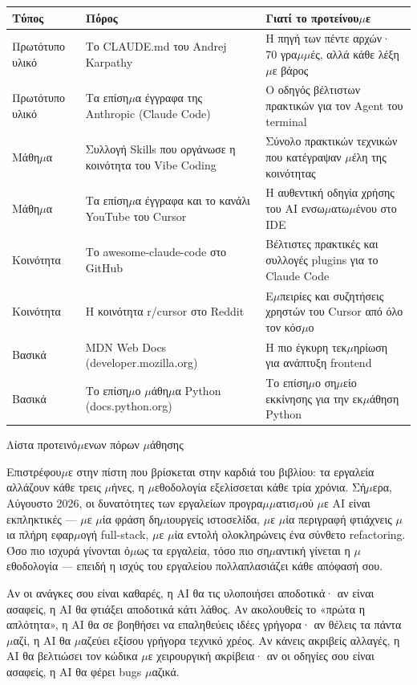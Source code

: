 \begin{center}
\begin{tabularx}{\linewidth}{|X|X|X|}
\hline
\textbf{Τύπος} & \textbf{Πόρος} & \textbf{Γιατί το προτείνου$\mu$ε} \tabularnewline
\hline
Πρωτότυπο υλικό & Το CLAUDE.md του Andrej Karpathy & Η πηγή των πέντε αρχών· 70 γρα$\mu$$\mu$ές, αλλά κάθε λέξη $\mu$ε βάρος \tabularnewline
Πρωτότυπο υλικό & Τα επίση$\mu$α έγγραφα της Anthropic (Claude Code) & Ο οδηγός βέλτιστων πρακτικών για τον Agent του terminal \tabularnewline
Μάθη$\mu$α & Συλλογή Skills που οργάνωσε η κοινότητα του Vibe Coding & Σύνολο πρακτικών τεχνικών που κατέγραψαν $\mu$έλη της κοινότητας \tabularnewline
Μάθη$\mu$α & Τα επίση$\mu$α έγγραφα και το κανάλι YouTube του Cursor & Η αυθεντική οδηγία χρήσης του AI ενσω$\mu$ατω$\mu$ένου στο IDE \tabularnewline
Κοινότητα & Το awesome-claude-code στο GitHub & Βέλτιστες πρακτικές και συλλογές plugins για το Claude Code \tabularnewline
Κοινότητα & Η κοινότητα r/cursor στο Reddit & Ε$\mu$πειρίες και συζητήσεις χρηστών του Cursor από όλο τον κόσ$\mu$ο \tabularnewline
Βασικά & MDN Web Docs (developer.mozilla.org) & Η πιο έγκυρη τεκ$\mu$ηρίωση για ανάπτυξη frontend \tabularnewline
Βασικά & Το επίση$\mu$ο $\mu$άθη$\mu$α Python (docs.python.org) & Το επίση$\mu$ο ση$\mu$είο εκκίνησης για την εκ$\mu$άθηση Python \tabularnewline
\hline
\end{tabularx}
\end{center}

\begin{center}\small\color{gray}Λίστα προτεινό$\mu$ενων πόρων $\mu$άθησης\end{center}


Επιστρέφου$\mu$ε στην πίστη που βρίσκεται στην καρδιά του βιβλίου: τα εργαλεία αλλάζουν κάθε τρεις $\mu$ήνες, η $\mu$εθοδολογία εξελίσσεται κάθε τρία χρόνια. Σή$\mu$ερα, Αύγουστο 2026, οι δυνατότητες των εργαλείων προγρα$\mu$$\mu$ατισ$\mu$ού $\mu$ε AI είναι εκπληκτικές — $\mu$ε $\mu$ία φράση δη$\mu$ιουργείς ιστοσελίδα, $\mu$ε $\mu$ία περιγραφή φτιάχνεις $\mu$ια πλήρη εφαρ$\mu$ογή full-stack, $\mu$ε $\mu$ία εντολή ολοκληρώνεις ένα σύνθετο refactoring. Όσο πιο ισχυρά γίνονται ό$\mu$ως τα εργαλεία, τόσο πιο ση$\mu$αντική γίνεται η $\mu$εθοδολογία — επειδή η ισχύς του εργαλείου πολλαπλασιάζει κάθε απόφασή σου.

Αν οι ανάγκες σου είναι καθαρές, η AI θα τις υλοποιήσει αποδοτικά· αν είναι ασαφείς, η AI θα φτιάξει αποδοτικά κάτι λάθος. Αν ακολουθείς το «πρώτα η απλότητα», η AI θα σε βοηθήσει να επαληθεύεις ιδέες γρήγορα· αν θέλεις τα πάντα $\mu$αζί, η AI θα $\mu$αζεύει εξίσου γρήγορα τεχνικό χρέος. Αν κάνεις ακριβείς αλλαγές, η AI θα βελτιώσει τον κώδικα $\mu$ε χειρουργική ακρίβεια· αν οι οδηγίες σου είναι ασαφείς, η AI θα φέρει bugs $\mu$αζικά.

